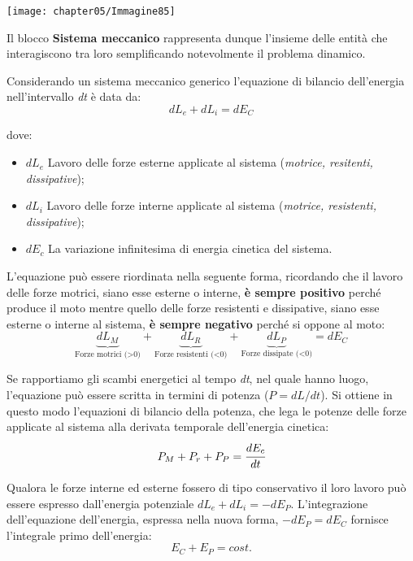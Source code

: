 		\begin{minipage}{0.5\textwidth}
		\centering
		\texttt{[image: chapter05/Immagine85]}
		\end{minipage}
		\hfill
		\begin{minipage}{0.5\textwidth}
			Il blocco \textbf{Sistema meccanico} rappresenta dunque l'insieme delle entità che interagiscono tra loro semplificando notevolmente il problema dinamico.
			
			Considerando un sistema meccanico generico l'equazione di bilancio dell'energia nell'intervallo \emph{dt} è data da:
			\[dL_e + dL_i = dE_C\]
		\end{minipage}
	\vspace{1mm}
	
	dove:
	\begin{itemize}
	\item $dL_e$ \hspace{2mm} Lavoro delle forze esterne applicate al sistema (\emph{motrice, resitenti, dissipative});
	\item $dL_i$ \hspace{2mm} Lavoro delle forze interne applicate al sistema (\emph{motrice, resistenti, dissipative});
	\item $dE_c$ \hspace{2mm} La variazione infinitesima di energia cinetica del sistema.
	\end{itemize}
	
	L'equazione può essere riordinata nella seguente forma, ricordando che il lavoro delle forze motrici, siano esse esterne o interne, \textbf{è sempre positivo} perché produce il moto mentre quello delle forze resistenti e dissipative, siano esse esterne o interne al sistema, \textbf{è sempre negativo} perché si oppone al moto:
	\[
	\underbrace{dL_M}_{\text{Forze motrici (>0)}} + \underbrace{dL_R}_{\text{Forze resistenti (<0)}} + \underbrace{dL_P}_{\text{Forze dissipate (<0)}} = dE_C
	\]
	
	Se rapportiamo gli scambi energetici al tempo \emph{dt}, nel quale hanno luogo, l'equazione può essere scritta in termini di potenza ($P = dL/dt$). Si ottiene in questo modo l'equazioni di bilancio della potenza, che lega le potenze delle forze applicate al sistema alla derivata temporale dell'energia cinetica:
	\[P_M + P_r + P_P = \cfrac{dE_c}{dt}\]
	
	Qualora le forze interne ed esterne fossero di tipo conservativo il loro lavoro può essere espresso dall'energia potenziale $dL_e + dL_i = -dE_P$.
	L'integrazione dell'equazione dell'energia, espressa nella nuova forma, $-dE_P = dE_C$ fornisce l'integrale primo dell'energia:
	\[ E_C + E_P = cost.\]
	
